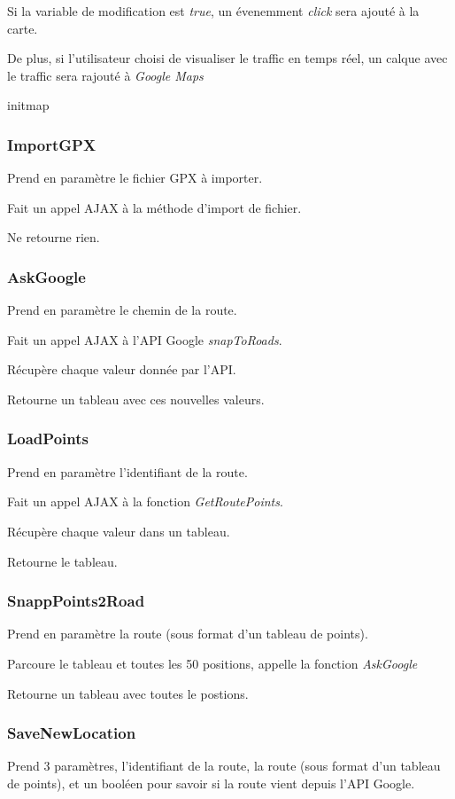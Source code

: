 \documentclass[a4paper]{article}
\newcommand{\gmap}{\emph{Google Maps}}
\newcommand{\diag}[1]{}
\begin{document}
Si la variable de modification est \emph{true}, un évenemment \emph{click} sera ajouté à la carte.

De plus, si l'utilisateur choisi de visualiser le traffic en temps réel, un calque avec le traffic sera rajouté à \gmap


\begin{center}
	\diag{initMap}
	\caption{initmap}
\end{center}

\subsubsection{ImportGPX}
Prend en paramètre le fichier GPX à importer.

Fait un appel AJAX à la méthode d'import de fichier.

Ne retourne rien.

\subsubsection{AskGoogle}
Prend en paramètre le chemin de la route.

Fait un appel AJAX à l'API Google \emph{snapToRoads}.

Récupère chaque valeur donnée par l'API.

Retourne un tableau avec ces nouvelles valeurs.

\subsubsection{LoadPoints}
Prend en paramètre l'identifiant de la route.

Fait un appel AJAX à la fonction \emph{GetRoutePoints}.

Récupère chaque valeur dans un tableau.

Retourne le tableau.

\subsubsection{SnappPoints2Road}
Prend en paramètre la route (sous format d'un tableau de points).

Parcoure le tableau et toutes les 50 positions, appelle la fonction \emph{AskGoogle}

Retourne un tableau avec toutes le postions.

\subsubsection{SaveNewLocation}
Prend 3 paramètres, l'identifiant de la route, la route (sous format d'un tableau de points), et un booléen pour savoir si la route vient depuis l'API Google.
\end{document}
